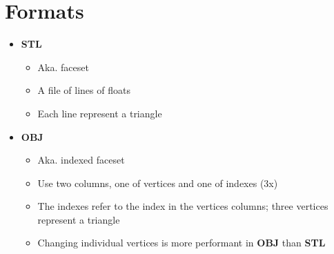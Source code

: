 \section{Formats}

\begin{itemize}
  \item \textbf{STL}
  \begin{itemize}
    \item Aka. faceset
    \item A file of lines of floats
    \item Each line represent a triangle
  \end{itemize}

  \item \textbf{OBJ}
  \begin{itemize}
    \item Aka. indexed faceset
    \item Use two columns, one of vertices and one of indexes (3x)
    \item The indexes refer to the index in the vertices columns;
    three vertices represent a triangle
    \item Changing individual vertices is more performant in \textbf{OBJ}
    than \textbf{STL}
  \end{itemize}
\end{itemize}
